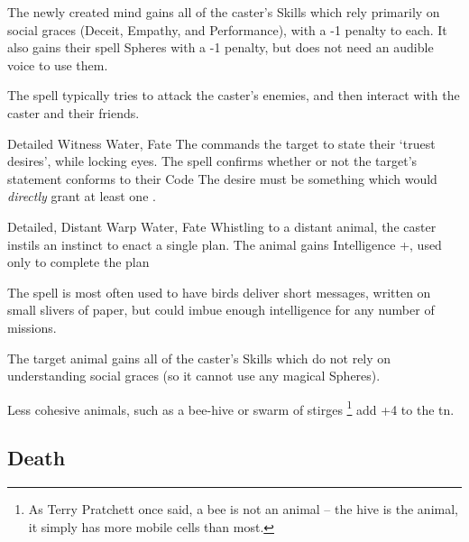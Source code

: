 \begin{multicols}{2}
{  The newly created mind gains all of the caster's Skills which rely primarily on social graces (Deceit, Empathy, and Performance), with a -1 penalty to each.
  It also gains their spell Spheres with a -1 penalty, but does not need an audible voice to use them.

  The spell typically tries to attack the caster's enemies, and then interact with the caster and their friends.

  }

  {Detailed}%
  {Witness}%
  {Water, Fate}%
  {}%
  {The  commands the target to state their `truest desires', while locking eyes.
    The spell confirms whether or not the target's statement conforms to their Code}%
  {The desire must be something which would \textit{directly} grant at least one .%
  }

\label{carrierCrow}
  {Detailed, Distant}%
  {Warp}%
  {Water, Fate}%
  {}%
  {Whistling to a distant animal, the caster instils an instinct to enact a single plan.
  The animal gains Intelligence +, used only to complete the plan}%
  {
  The spell is most often used to have birds deliver short messages, written on small slivers of paper, but could imbue enough intelligence for any number of missions.

  The target animal gains all of the caster's Skills which do not rely on understanding social graces (so it cannot use any magical Spheres).

  Less cohesive animals, such as a bee-hive or swarm of stirges%
  \footnote{As Terry Pratchett once said, a bee is not an animal -- the hive is the animal, it simply has more mobile cells than most.}
  add +4 to the \gls{tn}.
  }




\subsection{Death}
\label{deathSpells}
\label{Death1}




\end{multicols}
